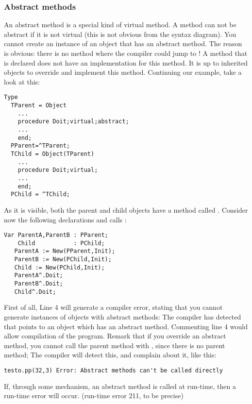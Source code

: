 \documentclass{report}
\begin{document}
\subsubsection{Abstract methods}
An abstract method is a special kind of virtual method. A method can not be
abstract if it is not virtual (this is not obvious from the syntax diagram).
You cannot create an instance of an object that has an abstract method.
The reason is obvious: there is no method where the compiler could jump to !
A method that is declared  does not have an implementation for
this method. It is up to inherited objects to override and implement this
method. Continuing our example, take a look at this:
\begin{verbatim}
Type
  TParent = Object
    ...
    procedure Doit;virtual;abstract;
    ...
    end;
  PParent=^TParent;
  TChild = Object(TParent)
    ...
    procedure Doit;virtual;
    ...
    end;
  PChild = ^TChild;
\end{verbatim}
As it is visible, both the parent and child objects have a method called
. Consider now the following declarations and calls :
\begin{verbatim}
Var ParentA,ParentB : PParent;
    Child           : PChild;
   ParentA := New(PParent,Init);
   ParentB := New(PChild,Init);
   Child := New(PChild,Init);
   ParentA^.Doit;
   ParentB^.Doit;
   Child^.Doit;
\end{verbatim}
First of all, Line 4 will generate a compiler error, stating that you cannot
generate instances of objects with abstract methods: The compiler has
detected that  points to an object which has an abstract
method. Commenting line 4 would allow compilation of the program.
Remark that if you override an abstract method, you cannot call the parent
method with , since there is no parent method; The compiler
will detect this, and complain about it, like this:
\begin{verbatim}
testo.pp(32,3) Error: Abstract methods can't be called directly
\end{verbatim}
If, through some mechanism, an abstract method is called at run-time,
then a run-time error will occur. (run-time error 211, to be precise)
\end{document}
